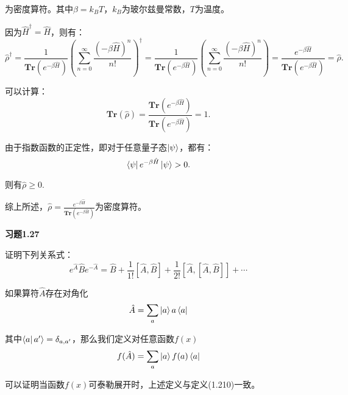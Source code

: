 \documentclass[reqno,a4paper,12pt]{amsart}
\begin{document}
为密度算符。其中$\beta = k_B T$，$k_B$为玻尔兹曼常数，$T$为温度。
\begin{tcolorbox}[breakable, colback = black!5!white, colframe = black]
因为$\hat{H}^\dagger = \hat{H}$，则有：
\[
	\hat{\rho}^\dagger = \frac{1}{\mathbf{Tr}(e^{-\beta \hat{H}})}\left( \sum_{n=0}^\infty \frac{(-\beta\hat{H})^n}{n!} \right)^\dagger = \frac{1}{\mathbf{Tr}(e^{-\beta \hat{H}})}\left( \sum_{n=0}^\infty \frac{(-\beta\hat{H})^n}{n!} \right) = \frac{e^{-\beta \hat{H}}}{\mathbf{Tr}(e^{-\beta \hat{H}})} = \hat{\rho}.
\]

可以计算：
\[
	\mathbf{Tr}(\hat{\rho}) = \frac{\mathbf{Tr}(e^{-\beta \hat{H}})}{\mathbf{Tr}(e^{-\beta \hat{H}})} = 1.
\]

由于指数函数的正定性，即对于任意量子态$\ket{\psi}$，都有：
\[
	\bra{\psi} e^{-\beta \hat{H}} \ket{\psi} > 0.
\]

则有$\hat{\rho} \geq 0$.

综上所述，$\hat{\rho} = \frac{e^{-\beta \hat{H}}}{\mathbf{Tr}(e^{-\beta \hat{H}})}$为密度算符。
\end{tcolorbox}

\textbf{习题1.27}

证明下列关系式：
\[
	e^{\hat{A}} \hat{B} e^{-\hat{A}} = \hat{B} + \frac{1}{1!}[\hat{A}, \hat{B}] + \frac{1}{2!}[\hat{A},[\hat{A},\hat{B}]] + \cdots
\]

如果算符$\hat{A}$存在对角化
\[
	\hat{A} = \sum_a \ket{a} a \bra{a}
\]

其中$\bra{a} a' \rangle = \delta_{a,a'}$，那么我们定义对任意函数$f(x)$
\[
	f(\hat{A}) = \sum_a \ket{a}f(a)\bra{a}
\]

可以证明当函数$f(x)$可泰勒展开时，上述定义与定义(1.210)一致。
\end{document}
